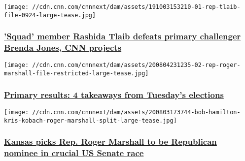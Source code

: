 \href{/2020/08/05/politics/rashida-tlaib-wins-primary-brenda-jones-michigan-results/index.html}{}

\texttt{[image: //cdn.cnn.com/cnnnext/dam/assets/191003153210-01-rep-tlaib-file-0924-large-tease.jpg]}

\hypertarget{squad-member-rashida-tlaib-defeats-primary-challenger-brenda-jones-cnn-projects}{%
\subsubsection{\texorpdfstring{\href{/2020/08/05/politics/rashida-tlaib-wins-primary-brenda-jones-michigan-results/index.html}{'Squad'
member Rashida Tlaib defeats primary challenger Brenda Jones, CNN
projects}}{'Squad' member Rashida Tlaib defeats primary challenger Brenda Jones, CNN projects}}\label{squad-member-rashida-tlaib-defeats-primary-challenger-brenda-jones-cnn-projects}}

\href{/2020/08/05/politics/primary-results-takeaways-august-4/index.html}{}

\texttt{[image: //cdn.cnn.com/cnnnext/dam/assets/200804231235-02-rep-roger-marshall-file-restricted-large-tease.jpg]}

\hypertarget{primary-results-4-takeaways-from-tuesdays-elections}{%
\subsubsection{\texorpdfstring{\href{/2020/08/05/politics/primary-results-takeaways-august-4/index.html}{Primary
results: 4 takeaways from Tuesday's
elections}}{Primary results: 4 takeaways from Tuesday's elections}}\label{primary-results-4-takeaways-from-tuesdays-elections}}

\href{/2020/08/04/politics/kansas-senate-election-primary-results/index.html}{}

\texttt{[image: //cdn.cnn.com/cnnnext/dam/assets/200803173744-bob-hamilton-kris-kobach-roger-marshall-split-large-tease.jpg]}

\hypertarget{kansas-picks-rep-roger-marshall-to-be-republican-nominee-in-crucial-us-senate-race}{%
\subsubsection{\texorpdfstring{\href{/2020/08/04/politics/kansas-senate-election-primary-results/index.html}{Kansas
picks Rep. Roger Marshall to be Republican nominee in crucial US Senate
race}}{Kansas picks Rep. Roger Marshall to be Republican nominee in crucial US Senate race}}\label{kansas-picks-rep-roger-marshall-to-be-republican-nominee-in-crucial-us-senate-race}}

